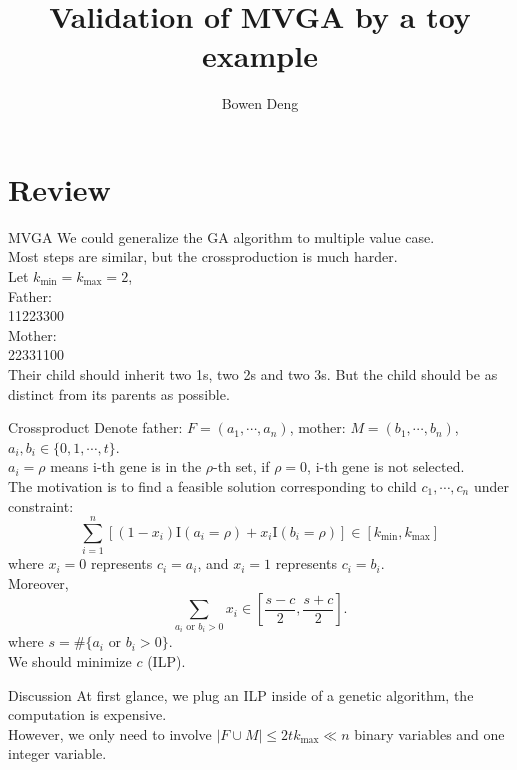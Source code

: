 \documentclass[xcolor=dvipsnames]{beamer}
\begin{document}
\title{Validation of MVGA by a toy example}
\author{Bowen Deng}
\date{}
\begin{frame}
\maketitle
\end{frame}
\begin{frame}
\tableofcontents
\end{frame}
\section{Review}
\begin{frame}{MVGA}
We could generalize the GA algorithm to multiple value case.\\
Most steps are similar, but the crossproduction is much harder.\\
Let $k_{\min}=k_{\max}=2$,\\
Father:\\
11223300\\
Mother:\\
22331100\\
Their child should inherit two 1s, two 2s and two 3s. But the child should be as distinct from its parents as possible.\\
\end{frame}
\begin{frame}{Crossproduct}
Denote father: $F=(a_1,\cdots,a_n)$, mother: $M=(b_1,\cdots,b_n)$, $a_i,b_i\in\{0,1,\cdots,t\}$.\\
$a_i=\rho$ means i-th gene is in the $\rho$-th set, if $\rho=0$, i-th gene is not selected.\\
The motivation is to find a feasible solution corresponding to child $c_1,\cdots,c_n$ under constraint:\\
\[
\sum_{i=1}^n[(1-x_i)\mathrm{I}(a_i=\rho)+x_i\mathrm{I}(b_i=\rho)]\in[k_{\min},k_{\max}]
\]
where $x_i=0$ represents $c_i=a_i$, and $x_i=1$ represents $c_i=b_i$.\\
Moreover,\\
\[\sum_{a_i\text{ or }b_i>0}x_i\in[\frac{s-c}{2},\frac{s+c}{2}].\]
where $s=\#\{a_i\text{ or }b_i>0\}$.\\
We should minimize $c$ (ILP).\\
\end{frame}
\begin{frame}{Discussion}
At first glance, we plug an ILP inside of a genetic algorithm, the computation is expensive.\\
However, we only need to involve $|F\cup M|\leqslant 2tk_{\max}\ll n$ binary variables and one integer variable.\\
\end{frame}
\end{document}
